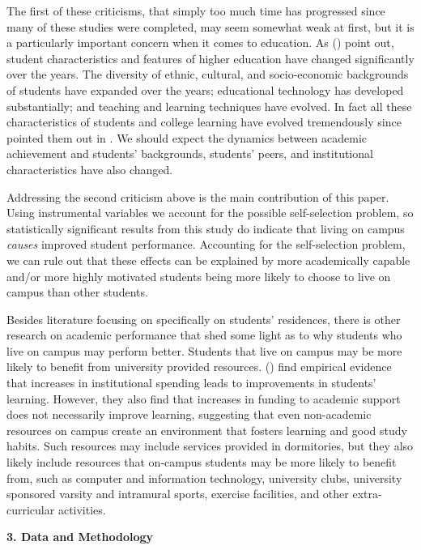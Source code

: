\documentclass[12pt]{article}
\newcommand{\citee}[1]{\citename{#1} (\citeyear{#1})}
\begin{document}
The first of these criticisms, that simply too much time has progressed since many of these studies were completed, may seem somewhat weak at first, but it is a particularly important concern when it comes to education. As \citee{pt1991} point out, student characteristics and features of higher education have changed significantly over the years. The diversity of ethnic, cultural, and socio-economic backgrounds of students have expanded over the years; educational technology has developed substantially; and teaching and learning techniques have evolved. In fact all these characteristics of students and college learning have evolved tremendously since  pointed them out in \citeyear{pt1991}.  We should expect the dynamics between academic achievement and students' backgrounds, students' peers, and institutional characteristics have also changed.

Addressing the second criticism above is the main contribution of this paper. Using instrumental variables we account for the possible self-selection problem, so statistically significant results from this study do indicate that living on campus \textit{causes} improved student performance.  Accounting for the self-selection problem, we can rule out that these effects can be explained by more academically capable and/or more highly motivated students being more likely to choose to live on campus than other students.

Besides literature focusing on specifically on students' residences, there is other research on academic performance that shed some light as to why students who live on campus may perform better. Students that live on campus may be more likely to benefit from university provided resources. \citee{ts2001} find empirical evidence that increases in institutional spending leads to improvements in students' learning. However, they also find that increases in funding to academic support does not necessarily improve learning, suggesting that even non-academic resources on campus create an environment that fosters learning and good study habits. Such resources may include services provided in dormitories, but they also likely include resources that on-campus students may be more likely to benefit from, such as computer and information technology, university clubs, university sponsored varsity and intramural sports, exercise facilities, and other extra-curricular activities. 

\begin{center}\textbf{3. Data and Methodology}\end{center}
\end{document}
